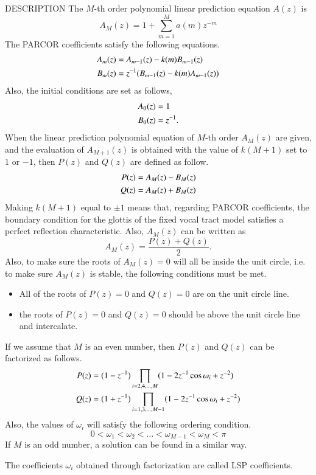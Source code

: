 \begin{qsection}{DESCRIPTION}
The $M$-th order polynomial linear prediction equation $A(z)$ is
\begin{displaymath}
  A_M(z) = 1 + \sum_{m=1}^M a(m) z^{-m}
\end{displaymath}
The PARCOR coefficients satisfy the following equations.
\begin{align}
  A_m(z) &= A_{m-1}(z) - k(m) B_{m-1}(z) \notag \\
  B_m(z) &= z^{-1} (B_{m-1}(z) - k(m) A_{m-1}(z)) \notag
\end{align}
Also, the initial conditions are set as follows,
\begin{align}
  A_0(z) &= 1 \notag \\
  B_0(z) &= z^{-1}.
\end{align}
When the linear prediction polynomial equation
of $M$-th order $A_M(z)$ are given, and the evaluation of $A_{M+1}(z)$
is obtained with the value of $k(M+1)$ set to $1$ or $-1$, then
$P(z)$ and $Q(z)$ are defined as follow.
\begin{align}
  P(z) &= A_M(z) - B_M(z) \notag \\
  Q(z) &= A_M(z) + B_M(z) \notag
\end{align}
Making $k(M+1)$ equal to $\pm 1$ means that,
regarding PARCOR coefficients,
the boundary condition for the glottis of the fixed vocal tract model
satisfies a perfect reflection characteristic.
Also, $A_M(z)$ can be written as
\begin{displaymath}
  A_M(z) =  \frac{P(z) + Q(z)}{2}.
\end{displaymath}
Also, to make sure the roots of $A_M(z)=0$ will all be inside
the unit circle, i.e. to make sure $A_M(z)$ is stable, the following
conditions must be met.
\begin{itemize}
\item All of the roots of $P(z)=0$ and $Q(z)=0$ are on the unit circle
      line.
\item the roots of $P(z)=0$ and $Q(z)=0$ should be above the unit
      circle line and intercalate.
\end{itemize}
\par
If we assume that $M$ is an even number, then
$P(z)$ and $Q(z)$ can be factorized as follows.
\begin{align}
  P(z) &= ( 1 - z^{-1} ) \prod_{i=2,4,\dots,M}
          ( 1 - 2 z^{-1} \cos \omega_i + z^{-2} ) \notag \\
  Q(z) &= ( 1 + z^{-1} ) \prod_{i=1,3,\dots,M-1}
          ( 1 - 2 z^{-1} \cos \omega_i + z^{-2} ) \notag
\end{align}
Also, the values of $\omega_i$ will satisfy the following ordering condition.
\begin{displaymath}
  0 < \omega_1 < \omega_2 < \dots < \omega_{M-1} < \omega_M < \pi
\end{displaymath}
If $M$ is an odd number, a solution can be found in a similar way.

The coefficients $\omega_i$ obtained through factorization are called
LSP coefficients.
\end{qsection}

